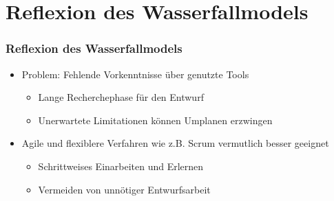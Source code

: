 \section{Reflexion des Wasserfallmodels}

\begin{frame}\frametitle{Reflexion des Wasserfallmodels}
    \begin{itemize}
        \item Problem: Fehlende Vorkenntnisse über genutzte Tools 
            \begin{itemize}
                \item Lange Recherchephase für den Entwurf
                \item Unerwartete Limitationen können Umplanen erzwingen
            \end{itemize}
        \item Agile und flexiblere Verfahren wie z.B. Scrum vermutlich besser geeignet
            \begin{itemize}
                \item Schrittweises Einarbeiten und Erlernen
                \item Vermeiden von unnötiger Entwurfsarbeit
            \end{itemize}
    \end{itemize}
\end{frame}

